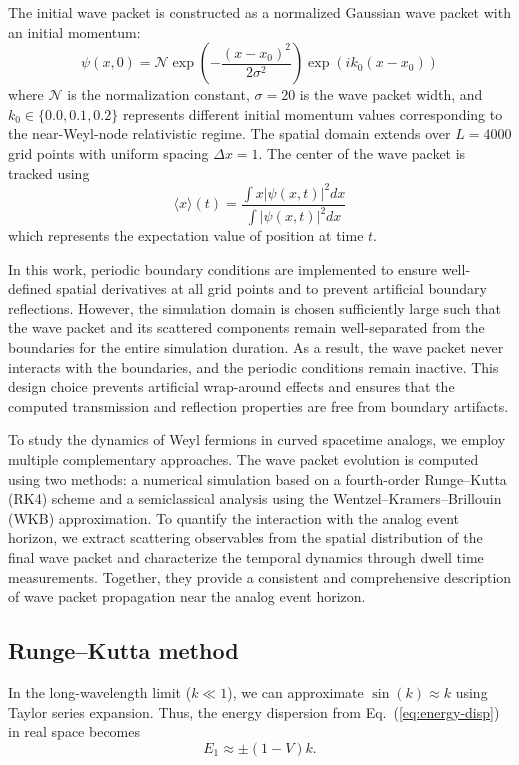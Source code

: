\documentclass[%
 aip,
 amsmath,amssymb,
 reprint,%
]{revtex4-1}
\begin{document}
The initial wave packet is constructed as a normalized Gaussian wave packet with an initial momentum:
\begin{equation}
\psi(x,0) = \mathcal{N} \exp\left(-\frac{(x-x_0)^2}{2\sigma^2}\right) \exp(ik_0(x-x_0))
\label{eq:initial_wavefunction}
\end{equation}
where $\mathcal{N}$ is the normalization constant, $\sigma = 20$ is the wave packet width, and $k_0 \in \{0.0, 0.1, 0.2\}$ represents different initial momentum values corresponding to the near-Weyl-node relativistic regime. The spatial domain extends over $L = 4000$ grid points with uniform spacing $\Delta x = 1$. The center of the wave packet is tracked using
\begin{equation}
    \langle x \rangle (t) = \frac{\int x|\psi(x,t)|^2 dx}{\int |\psi(x,t)|^2dx}
\end{equation}
which represents the expectation value of position at time $t$.

In this work, periodic boundary conditions are implemented to ensure well-defined spatial derivatives at all grid points and to prevent artificial boundary reflections. However, the simulation domain is chosen sufficiently large such that the wave packet and its scattered components remain well-separated from the boundaries for the entire simulation duration. As a result, the wave packet never interacts with the boundaries, and the periodic conditions remain inactive. This design choice prevents artificial wrap-around effects and ensures that the computed transmission and reflection properties are free from boundary artifacts.

To study the dynamics of Weyl fermions in curved spacetime analogs, we employ multiple complementary approaches. The wave packet evolution is computed using two methods: a numerical simulation based on a fourth-order Runge–Kutta (RK4) scheme and a semiclassical analysis using the Wentzel–Kramers–Brillouin (WKB) approximation. To quantify the interaction with the analog event horizon, we extract scattering observables from the spatial distribution of the final wave packet and characterize the temporal dynamics through dwell time measurements. Together, they provide a consistent and comprehensive description of wave packet propagation near the analog event horizon.

\subsection{Runge–Kutta method}
In the long-wavelength limit ($k \ll 1$), we can approximate $\sin(k) \approx k$ using Taylor series expansion. Thus, the energy dispersion from Eq.~(\ref{eq:energy-disp}) in real space becomes
\begin{equation}
\label{eq:linear_dispersion}
    E_1 \approx \pm(1 - V) k.
\end{equation}
\end{document}
